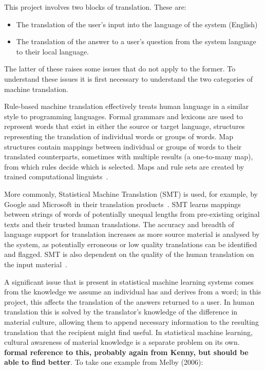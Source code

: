 \documentclass[authoryearcitations]{UoYCSproject}
\begin{document}
This project involves two blocks of translation.  These are:
\begin{itemize}
  \item The translation of the user's input into the language of the system (English)
  \item The translation of the answer to a user's question from the system language to their local language.
\end{itemize}
The latter of these raises some issues that do not apply to the former. To understand these issues it is first necessary to understand the two categories of machine translation.

Rule-based machine translation effectively treats human language in a similar style to programming languages.  Formal grammars and lexicons are used to represent words that exist in either the source or target language, structures representing the translation of individual words or groups of words.  Map structures contain mappings between individual or groups of words to their translated counterparts, sometimes with multiple results (a one-to-many map), from which rules decide which is selected.  Maps and rule sets are created by trained computational linguists~\cite{kenny2011ethics}.

More commonly, Statistical Machine Translation (SMT) is used, for example, by Google and Microsoft in their translation products~\cite{kenny2011ethics, Google_Translate_Research}.  SMT learns mappings between strings of words of potentially unequal lengths from pre-existing original texts and their trusted human translations.  The accuracy and breadth of language support for translation increases as more source material is analysed by the system, as potentially erroneous or low quality translations can be identified and flagged.  SMT is also dependent on the quality of the human translation on the input material~\cite{kenny2011ethics}.

A significant issue that is present in statistical machine learning systems comes from the knowledge we assume an individual has and derives from a word; in this project, this affects the translation of the answers returned to a user.  In human translation this is solved by the translator's knowledge of the difference in material culture, allowing them to append necessary information to the resulting translation that the recipient might find useful.  In statistical machine learning, cultural awareness of material knowledge is a separate problem on its own.  {\bf formal reference to this, probably again from Kenny, but should be able to find better}.  To take one example from Melby (2006):
\end{document}
